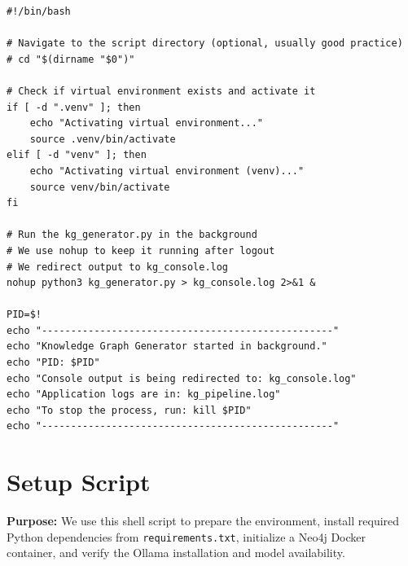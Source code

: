 \documentclass[11pt]{article}
\begin{document}
\begin{lstlisting}[style=bashcode, caption={run\_kg.sh}]
#!/bin/bash

# Navigate to the script directory (optional, usually good practice)
# cd "$(dirname "$0")"

# Check if virtual environment exists and activate it
if [ -d ".venv" ]; then
    echo "Activating virtual environment..."
    source .venv/bin/activate
elif [ -d "venv" ]; then
    echo "Activating virtual environment (venv)..."
    source venv/bin/activate
fi

# Run the kg_generator.py in the background
# We use nohup to keep it running after logout
# We redirect output to kg_console.log
nohup python3 kg_generator.py > kg_console.log 2>&1 &

PID=$!
echo "--------------------------------------------------"
echo "Knowledge Graph Generator started in background."
echo "PID: $PID"
echo "Console output is being redirected to: kg_console.log"
echo "Application logs are in: kg_pipeline.log"
echo "To stop the process, run: kill $PID"
echo "--------------------------------------------------"
\end{lstlisting}


\section{Setup Script} \label{sec:setup}
\textbf{Purpose:} We use this shell script to prepare the environment, install required Python dependencies from \texttt{requirements.txt}, initialize a Neo4j Docker container, and verify the Ollama installation and model availability.
\end{document}
